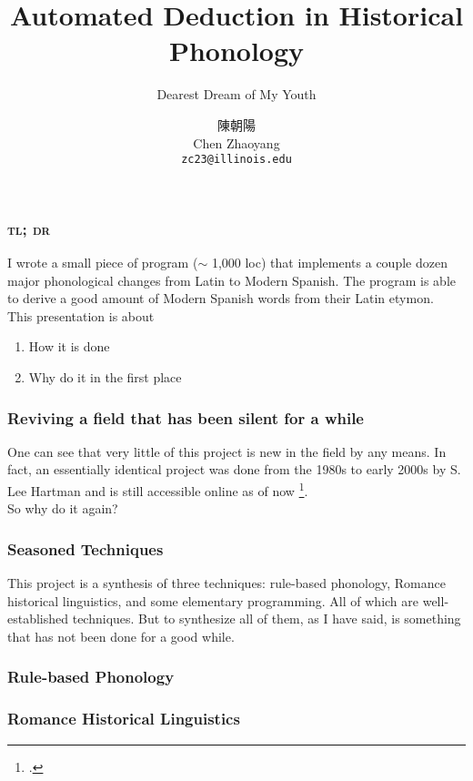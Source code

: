 \documentclass{beamer}
\title{Automated Deduction in Historical Phonology}
\subtitle{Dearest Dream of My Youth}
\author{陳朝陽 \\ Chen Zhaoyang \\ \texttt{zc23@illinois.edu}}
\begin{document}
\maketitle

\begin{frame}
  \frametitle{\textsc{tl; dr}}

  I wrote a small piece of program ($\sim$ 1,000 loc) that implements a couple dozen major phonological changes from Latin to Modern Spanish. The program is able to derive a good amount of Modern Spanish words from their Latin etymon. \\
  This presentation is about
  \begin{enumerate}
  \item How it is done
  \item Why do it in the first place
  \end{enumerate}
\end{frame}

\begin{frame}
  \frametitle{Reviving a field that has been silent for a while}

\end{frame}

\begin{frame}
  One can see that very little of this project is new in the field by any means. In fact, an essentially identical project was done from the 1980s to early 2000s by S. Lee Hartman and is still accessible online as of now \footcite{hartman_phono}. \\
  So why do it again? \\
\end{frame}

\begin{frame}
  \frametitle{Seasoned Techniques}

  This project is a synthesis of three techniques: rule-based phonology, Romance historical linguistics, and some elementary programming. All of which are well-established techniques. But to synthesize all of them, as I have said, is something that has not been done for a good while.
\end{frame}

\begin{frame}
  \frametitle{Rule-based Phonology}
\end{frame}

\begin{frame}
  \frametitle{Romance Historical Linguistics}
\end{frame}
\end{document}

